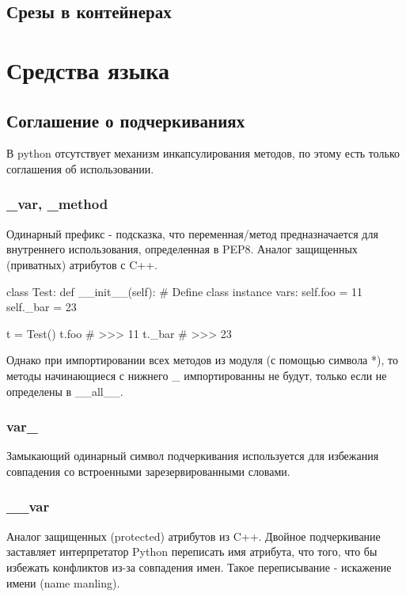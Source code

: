 \subsection{Срезы в контейнерах}

\section{Средства языка}

\subsection{Соглашение о подчеркиваниях}

В python отсутствует механизм инкапсулирования методов, по этому есть только соглашения об использовании.

\subsubsection{\_var, \_method}

Одинарный префикс - подсказка, что переменная/метод предназначается для внутреннего использования, определенная в PEP8. Аналог защищенных (приватных) атрибутов с C++.

\begin{python}
class Test:
    def __init__(self):
        # Define class instance vars:
        self.foo = 11 
        self._bar = 23

t = Test()
t.foo
# >>> 11
t._bar
# >>> 23
\end{python}

Однако при импортировании всех методов из модуля (с помощью символа *), то методы начинающиеся с нижнего \_ импортированны не будут, только если не определены в \_\_all\_\_.

\subsubsection{var\_}

Замыкающий одинарный символ подчеркивания используется для избежания совпадения со встроенными зарезервированными словами.

\subsubsection{\_\_var}

Аналог защищенных (protected) атрибутов из C++. Двойное подчеркивание заставляет интерпретатор Python переписать имя атрибута, что того, что бы избежать конфликтов из-за совпадения имен. Такое переписывание - искажение имени (name manling).

